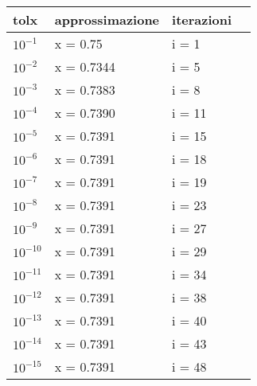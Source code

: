 \documentclass[20pt,a4paper]{book}
\begin{document}
\begin{tabular}{|l|l|l|l|}
\hline
tolx & approssimazione & iterazioni\\
\hline
\begin{math}10^{-1}\end{math} & x = 0.75 & i = 1\\
\hline
\begin{math}10^{-2}\end{math} & x = 0.7344 & i = 5\\
\hline
\begin{math}10^{-3}\end{math} & x = 0.7383 & i = 8\\
\hline
\begin{math}10^{-4}\end{math} & x = 0.7390 & i = 11\\
\hline
\begin{math}10^{-5}\end{math} & x = 0.7391 & i = 15\\
\hline
\begin{math}10^{-6}\end{math} & x = 0.7391 & i = 18\\
\hline
\begin{math}10^{-7}\end{math} & x = 0.7391 & i = 19\\
\hline
\begin{math}10^{-8}\end{math} & x = 0.7391 & i = 23\\
\hline
\begin{math}10^{-9}\end{math} & x = 0.7391 & i = 27\\
\hline
\begin{math}10^{-10}\end{math} & x = 0.7391 & i = 29\\
\hline
\begin{math}10^{-11}\end{math} & x = 0.7391 & i = 34\\
\hline
\begin{math}10^{-12}\end{math} & x = 0.7391 & i = 38\\
\hline
\begin{math}10^{-13}\end{math} & x = 0.7391 & i = 40\\
\hline
\begin{math}10^{-14}\end{math} & x = 0.7391 & i = 43\\
\hline
\begin{math}10^{-15}\end{math} & x = 0.7391 & i = 48\\
\hline
\end{tabular}
\end{document}
